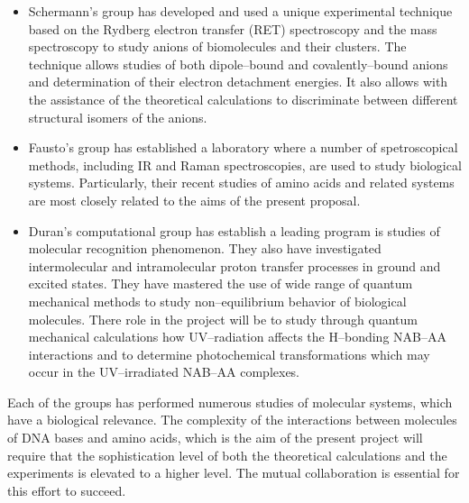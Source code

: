 \begin{itemize}
\item
Schermann's group has developed and used a unique experimental
technique based on the Rydberg electron transfer (RET) spectroscopy 
and the mass spectroscopy to study anions of biomolecules
and their clusters. The technique allows studies of both
dipole--bound and covalently--bound
anions and determination of their
electron detachment energies. It also allows with the 
assistance of the
theoretical calculations to discriminate
between different structural isomers of the anions.


\item
Fausto's group has established a laboratory where a number of
spetroscopical methods, including IR and Raman spectroscopies,
are used to study biological systems. Particularly, their
recent studies of amino acids and related systems are most
closely related to the aims of the present proposal.


\item
Duran's computational group has establish a leading program
is studies of molecular recognition phenomenon. They also
have investigated intermolecular and intramolecular proton
transfer processes in ground and excited states. They have
mastered the use of wide range of quantum mechanical methods
to study non--equilibrium behavior of biological molecules.
There role in the project will be to study through
quantum mechanical calculations how UV--radiation
affects the H--bonding NAB--AA interactions 
and to determine photochemical transformations which
may occur in the UV--irradiated NAB--AA complexes. 

\end{itemize} 

Each of the groups has performed numerous
studies of molecular systems, which have a biological relevance.
The complexity of the interactions between molecules of
DNA bases and amino acids, which is the aim of the present
project will require that the sophistication level of both
the theoretical calculations and the experiments is elevated
to a higher level. The mutual collaboration is essential
for this effort to succeed.


